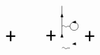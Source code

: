\begin{equation}
\begin{tikzpicture}[x=0.55pt,y=0.55pt,yscale=-1,xscale=1]
\draw    (316.24,103.26) .. controls (317.91,101.59) and (319.57,101.59) .. (321.24,103.26) .. controls (322.91,104.93) and (324.57,104.93) .. (326.24,103.26) -- (331.1,103.26) -- (331.1,103.26) ;
\draw  [fill={rgb, 255:red, 0; green, 0; blue, 0 }  ,fill opacity=1 ] (335.95,95.72) -- (341.59,93.11) -- (341.91,97.48) -- cycle ;
\draw    (316.14,23.82) -- (316.14,80) ;
\draw  [fill={rgb, 255:red, 0; green, 0; blue, 0 }  ,fill opacity=1 ] (316.19,38.9) -- (318.38,44.72) -- (314,44.72) -- cycle ;
\draw  [fill={rgb, 255:red, 0; green, 0; blue, 0 }  ,fill opacity=1 ] (316.14,77.09) -- (318.33,82.91) -- (313.95,82.91) -- cycle ;
\draw   (331.1,62.26) .. controls (331.1,57.98) and (334.57,54.51) .. (338.85,54.51) .. controls (343.13,54.51) and (346.6,57.98) .. (346.6,62.26) .. controls (346.6,66.54) and (343.13,70.01) .. (338.85,70.01) .. controls (334.57,70.01) and (331.1,66.54) .. (331.1,62.26) -- cycle ;
\draw    (316.24,62.26) .. controls (317.91,60.59) and (319.57,60.59) .. (321.24,62.26) .. controls (322.91,63.93) and (324.57,63.93) .. (326.24,62.26) -- (331.1,62.26) -- (331.1,62.26) ;
\draw  [fill={rgb, 255:red, 0; green, 0; blue, 0 }  ,fill opacity=1 ] (335.95,54.72) -- (341.59,52.11) -- (341.91,56.48) -- cycle ;
\draw [line width=1.5]    (212.25,80.8) -- (229.25,80.8) ;
\draw [line width=1.5]    (220.75,90.4) -- (220.75,71.21) ;

\draw [line width=1.5]    (287.25,79.8) -- (304.25,79.8) ;
\draw [line width=1.5]    (295.75,89.4) -- (295.75,70.21) ;

\draw [line width=1.5]    (359.25,80.8) -- (376.25,80.8) ;
\draw [line width=1.5]    (367.75,90.4) -- (367.75,71.21) ;


\end{tikzpicture}
\end{equation}
